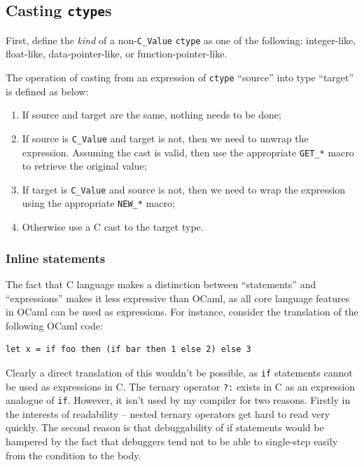 \documentclass[12pt,a4paper,twoside,openright]{report}
\begin{document}
\subsection{Casting \texttt{ctype}s}

First, define the \textit{kind} of a non-\lstinline!C_Value! \lstinline!ctype!
as one of the following: integer-like, float-like, data-pointer-like, or
function-pointer-like.

The operation of casting from an expression of \lstinline!ctype! ``source''
into type ``target'' is defined as below:

\begin{enumerate}
  \item If source and target are the same, nothing needs to be done;
  \item If source is \lstinline!C_Value! and target is not, then we need to
    unwrap the expression. Assuming the cast is valid, then use the appropriate
    \lstinline!GET_*! macro to retrieve the original value;
  \item If target is \lstinline!C_Value! and source is not, then we need to
    wrap the expression using the appropriate \lstinline!NEW_*! macro;
  \item Otherwise use a C cast to the target type.
\end{enumerate}

\subsubsection{Inline statements}\label{c-inline-statements}

The fact that C language makes a distinction between ``statements'' and
``expressions'' makes it less expressive than OCaml, as all core language
features in OCaml can be used as expressions. For instance, consider the
translation of the following OCaml code:

\begin{lstlisting}
let x = if foo then (if bar then 1 else 2) else 3
\end{lstlisting}

Clearly a direct translation of this wouldn't be possible, as \lstinline!if!
statements cannot be used as expressions in C. The ternary operator
\lstinline!?:! exists in C as an expression analogue of \lstinline!if!.
However, it isn't used by my compiler for two reasons.  Firstly in the
interests of readability -- nested ternary operators get hard to read very
quickly. The second reason is that debuggability of if statements would be
hampered by the fact that debuggers tend not to be able to single-step easily
from the condition to the body.
\end{document}
